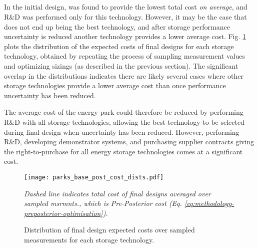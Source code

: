 \newpage
\subsection{} \label{sec:parks-design-with-option}


In the initial design,  was found to provide the lowest total cost \textit{on average}, and R\&D was performed only for this technology. However, it may be the case that  does not end up being the best technology, and after storage performance uncertainty is reduced another technology provides a lower average cost. Fig. \ref{fig:parks-tech-cost-dists} plots the distribution of the expected costs of final designs for each storage technology, obtained by repeating the process of sampling measurement values and optimizing sizings (as described in the previous section). The significant overlap in the distributions indicates there are likely several cases where other storage technologies provide a lower average cost than  once performance uncertainty has been reduced.

The average cost of the energy park could therefore be reduced by performing R\&D with all storage technologies, allowing the best technology to be selected during final design when uncertainty has been reduced. However, performing R\&D, developing demonstrator systems, and purchasing supplier contracts  giving the right-to-purchase for all energy storage technologies comes at a significant cost.\\

\begin{figure}[h]
    \centering
    \texttt{[image: parks\_base\_post\_cost\_dists.pdf]}
    \caption{Distribution of final design expected costs over sampled measurements for each storage technology.}
    \label{fig:parks-tech-cost-dists}
    \vspace*{0.1cm}
    \footnotesize{\it Dashed line indicates total cost of final designs averaged over sampled msrmnts., which is Pre-Posterior cost (Eq. \ref{eq:methodology-preposterior-optimisation}).}
\end{figure}

